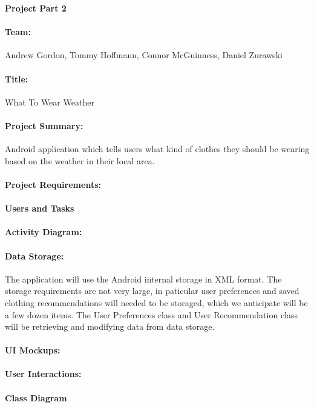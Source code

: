 \documentclass[12pt,a4paper]{article}
\begin{document}

\noindent\textbf{Project Part 2}

\paragraph{Team:}Andrew Gordon, Tommy Hoffmann, Connor McGuinness, Daniel Zurawski

\paragraph{Title:}What To Wear Weather

\paragraph{Project Summary:}Android application which tells users what kind
of clothes they should be wearing based on the weather in their local area.

\paragraph{Project Requirements:}

\paragraph{Users and Tasks}

\paragraph{Activity Diagram:}

\paragraph{Data Storage:} The application will use the Android internal storage in XML format.
The storage requirements are not very large, in paticular user preferences and saved clothing recommendations
will needed to be storaged, which we anticipate will be a few dozen items. The User Preferences class and User Recommendation class will be retrieving and modifying data from data storage.

\paragraph{UI Mockups:}

\paragraph{User Interactions:}

\paragraph{Class Diagram}
\end{document}
